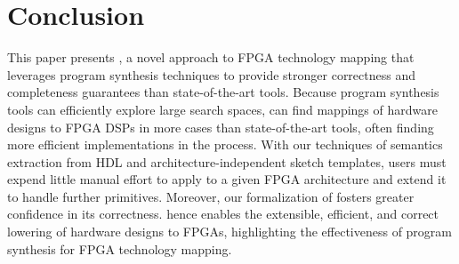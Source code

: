 \section{Conclusion}
\label{sec:conclusion}

This paper presents \lr, 
  a novel approach to FPGA technology mapping
  that leverages program synthesis techniques
  to provide stronger correctness and completeness guarantees 
  than state-of-the-art tools.
Because program synthesis tools
  can efficiently explore large search spaces, 
  \lr 
  can find mappings
  of hardware designs
  to FPGA DSPs
  in more cases
  than state-of-the-art tools,
  often finding more efficient implementations
  in the process.
With our techniques
  of semantics extraction
  from HDL
  and architecture-independent sketch templates,
  users must expend little manual effort 
  to apply \lr to
  a given FPGA architecture
  and extend it to handle further primitives.
Moreover, our formalization of \lr
  fosters greater confidence
  in its correctness.
\lr hence enables the 
  extensible, efficient, and correct 
  lowering of hardware designs to FPGAs,
  highlighting the effectiveness
  of program synthesis
  for FPGA technology mapping.


